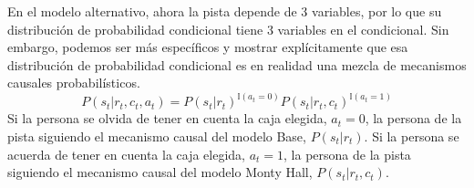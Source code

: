 \documentclass[a4paper,10pt]{article}
\begin{document}
En el modelo alternativo, ahora la pista depende de 3 variables, por lo que su distribución de probabilidad condicional tiene 3 variables en el condicional.
%
Sin embargo, podemos ser más específicos y mostrar explícitamente que esa distribución de probabilidad condicional es en realidad una mezcla de mecanismos causales probabilísticos.
%
\begin{equation}
P(s_t|r_t,c_t,a_t) = P(s_t|r_t)^{\mathbb{I}(a_t=0)} P(s_t|r_t,c_t)^{\mathbb{I}(a_t=1)}
\end{equation}
%
Si la persona se olvida de tener en cuenta la caja elegida, $a_t=0$, la persona de la pista siguiendo el mecanismo causal del modelo Base, $P(s_t|r_t)$.
%
Si la persona se acuerda de tener en cuenta la caja elegida, $a_t=1$, la persona de la pista siguiendo el mecanismo causal del modelo Monty Hall, $P(s_t|r_t,c_t)$.

\end{document}
